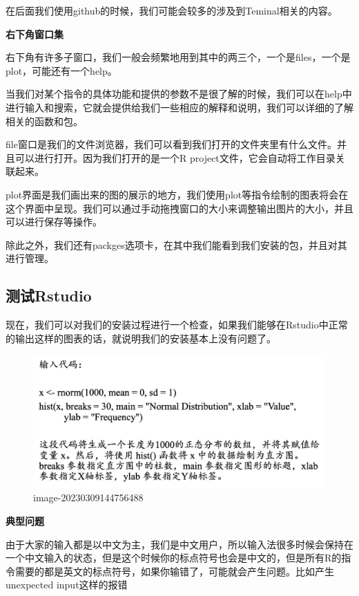 \documentclass[
  oneside]{book}
\begin{document}
在后面我们使用github的时候，我们可能会较多的涉及到Teminal相关的内容。

\textbf{右下角窗口集}

右下角有许多子窗口，我们一般会频繁地用到其中的两三个，一个是files，一个是plot，可能还有一个help。

当我们对某个指令的具体功能和提供的参数不是很了解的时候，我们可以在help中进行输入和搜索，它就会提供给我们一些相应的解释和说明，我们可以详细的了解相关的函数和包。

file窗口是我们的文件浏览器，我们可以看到我们打开的文件夹里有什么文件。并且可以进行打开。因为我们打开的是一个R
project文件，它会自动将工作目录关联起来。

plot界面是我们画出来的图的展示的地方，我们使用plot等指令绘制的图表将会在这个界面中呈现。我们可以通过手动拖拽窗口的大小来调整输出图片的大小，并且可以进行保存等操作。

除此之外，我们还有packges选项卡，在其中我们能看到我们安装的包，并且对其进行管理。

\hypertarget{2-Rstudio-test}{%
\subsection{测试Rstudio}\label{2-Rstudio-test}}

现在，我们可以对我们的安装过程进行一个检查，如果我们能够在Rstudio中正常的输出这样的图表的话，就说明我们的安装基本上没有问题了。

\begin{figure}
\centering
\includegraphics{1002-lesson2/image-20230309144756488.png}
\caption{image-20230309144756488}
\end{figure}

\textbf{典型问题}

由于大家的输入都是以中文为主，我们是中文用户，所以输入法很多时候会保持在一个中文输入的状态，但是这个时候你的标点符号也会是中文的，但是所有R的指令需要的都是英文的标点符号，如果你输错了，可能就会产生问题。比如产生unexpected
input这样的报错
\end{document}
